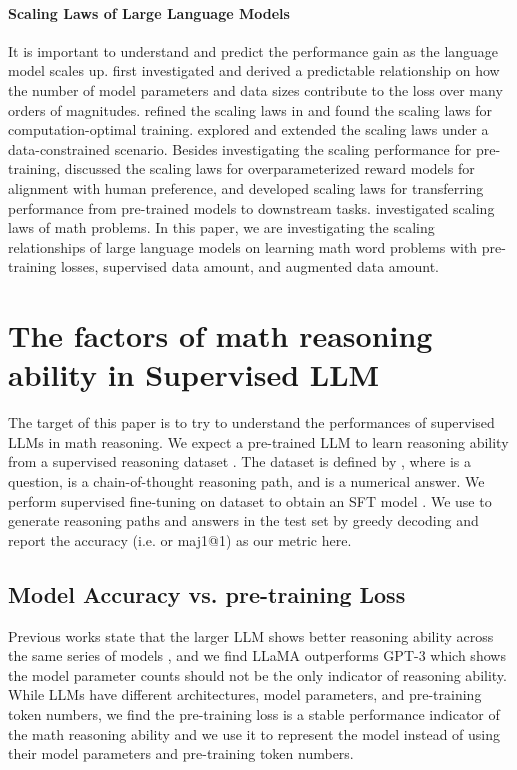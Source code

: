 \documentclass{article} \usepackage{iclr2021_conference,times}
\begin{document}
\paragraph{Scaling Laws of Large Language Models} It is important to understand and predict the performance gain as the language model scales up. \citet{scalinglaw} first investigated and derived a predictable relationship on how the number of model parameters and data sizes contribute to the loss over many orders of magnitudes. \citet{chinchilla} refined the scaling laws in \citep{scalinglaw} and found the scaling laws for computation-optimal training. \citet{muennighoff2023scaling} explored and extended the scaling laws under a data-constrained scenario. Besides investigating the scaling performance for pre-training, \citet{gao2022rmscaling} discussed the scaling laws for overparameterized reward models for alignment with human preference, and \citet{hernandez2021transferscaling} developed scaling laws for transferring performance from pre-trained models to downstream tasks.
\cite{henighan2020scaling,caballero2022broken} investigated scaling laws of math problems.
In this paper, we are investigating the scaling relationships of large language models on learning math word problems with pre-training losses, supervised data amount, and augmented data amount.

\section{The factors of math reasoning ability in Supervised LLM}

The target of this paper is to try to understand the performances of supervised LLMs in math reasoning. 
We expect a pre-trained LLM  to learn reasoning ability from a supervised reasoning dataset .
The dataset is defined by , where  is a question,  is a chain-of-thought reasoning path, and  is a numerical answer.
We perform supervised fine-tuning on dataset  to obtain an SFT model .
We use  to generate reasoning paths and answers in the test set by greedy decoding and report the accuracy (i.e.  or maj1@1) as our metric here.

\subsection{Model Accuracy vs. pre-training Loss}
Previous works state that the larger LLM shows better reasoning ability across the same series of models \citep{gpt3,chowdhery2022palm,llama,llama2}, and we find LLaMA outperforms GPT-3 which shows the model parameter counts should not be the only indicator of reasoning ability.
While LLMs have different architectures, model parameters, and pre-training token numbers, we find the pre-training loss is a stable performance indicator of the math reasoning ability and we use it to represent the model instead of using their model parameters and pre-training token numbers.
\end{document}
